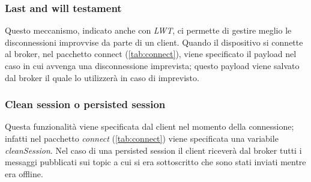 \documentclass[binding=0.6cm,TFA]{sapthesis}
\begin{document}
\begin{large}
\subsubsection{Last and will testament}
Questo meccanismo, indicato anche con \textit{LWT}, ci permette di gestire meglio le disconnessioni improvvise da parte di un client. Quando il dispositivo si connette al broker, nel pacchetto connect (\autoref{tab:connect}), viene specificato il payload nel caso in cui avvenga una disconnessione imprevista; questo payload viene salvato dal broker il quale lo utilizzerà in caso di imprevisto.

\subsubsection{Clean session o persisted session}
Questa funzionalità viene specificata dal client nel momento della connessione; infatti nel pacchetto \textit{connect} (\autoref{tab:connect}) viene specificata una variabile \textit{cleanSession}. Nel caso di una persisted session il client riceverà dal broker tutti i messaggi pubblicati sui topic a cui si era sottoscritto che sono stati inviati mentre era offline.
\end{large}
\end{document}
